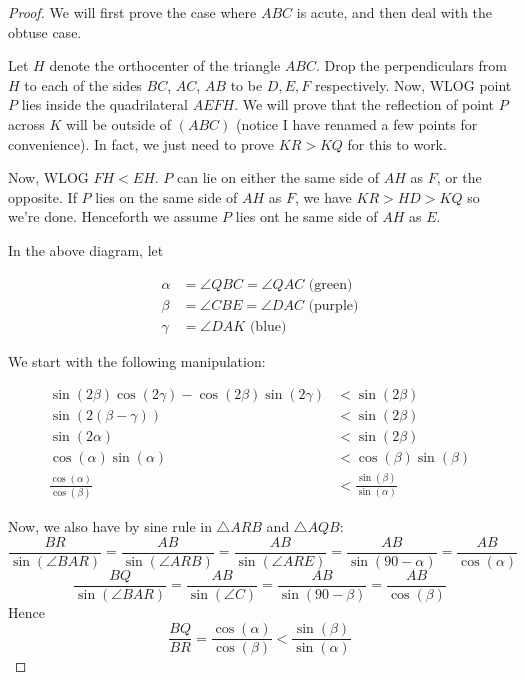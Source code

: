\documentclass{article}
\theoremstyle{mytheoremstyle}
\theoremstyle{mytheoremstyle}
\theoremstyle{myproblemstyle}
\begin{document}
    \begin{proof}
        We will first prove the case where $ABC$ is acute, and then deal with the obtuse case.

        Let $H$ denote the orthocenter of the triangle $ABC$. Drop the perpendiculars from $H$ to each of the sides $BC$, $AC$, $AB$ to be $D, E, F$ respectively. Now, WLOG point $P$ lies inside the quadrilateral $AEFH$. We will prove that the reflection of point $P$ across $K$ will be outside of $(ABC)$ (notice I have renamed a few points for convenience). In fact, we just need to prove $KR > KQ$ for this to work. 

        Now, WLOG $FH < EH$. $P$ can lie on either the same side of $AH$ as $F$, or the opposite. If $P$ lies on the same side of $AH$ as $F$, we have $KR > HD > KQ$ so we're done. Henceforth we assume $P$ lies ont he same side of $AH$ as $E$.


        In the above diagram, let 
        
        \begin{align*}
            \alpha &= \angle QBC = \angle QAC \text{ (green)}\\
            \beta &= \angle CBE = \angle DAC \text{ (purple)}\\
            \gamma &= \angle DAK \text{ (blue)}
        \end{align*}

        We start with the following manipulation:

        \begin{align*}
            \sin(2\beta)\cos(2\gamma) - \cos(2\beta)\sin(2\gamma) &< \sin(2\beta)\\
            \sin(2(\beta-\gamma)) &< \sin(2\beta)\\
            \sin(2\alpha) &< \sin(2\beta)\\
            \cos(\alpha)\sin(\alpha) &< \cos(\beta)\sin(\beta)\\
            \frac{\cos(\alpha)}{\cos(\beta)} &< \frac{\sin(\beta)}{\sin(\alpha)}
        \end{align*}

        Now, we also have by sine rule in $\triangle ARB$ and $\triangle AQB$: 
        \[\frac{BR}{\sin(\angle BAR)} = \frac{AB}{\sin(\angle ARB)} = \frac{AB}{\sin(\angle ARE)} = \frac{AB}{\sin(90-\alpha)} = \frac{AB}{\cos(\alpha)}\]
        \[\frac{BQ}{\sin(\angle BAR)} = \frac{AB}{\sin(\angle C)} = \frac{AB}{\sin(90 - \beta)} = \frac{AB}{\cos(\beta)}\]
        Hence \[\frac{BQ}{BR} = \frac{\cos(\alpha)}{\cos(\beta)} < \frac{\sin(\beta)}{\sin(\alpha)}\]


\end{proof}
\end{document}
